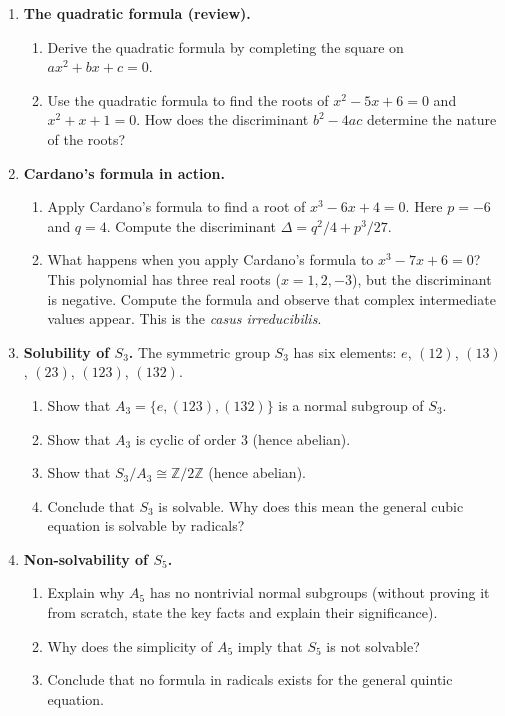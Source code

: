 \begin{enumerate}

    \item \textbf{The quadratic formula (review).}
    \begin{enumerate}
        \item Derive the quadratic formula by completing the square on $ax^2 + bx + c = 0$.
        \item Use the quadratic formula to find the roots of $x^2 - 5x + 6 = 0$ and $x^2 + x + 1 = 0$. How does the discriminant $b^2 - 4ac$ determine the nature of the roots?
    \end{enumerate}

    \item \textbf{Cardano's formula in action.}
    \begin{enumerate}
        \item Apply Cardano's formula to find a root of $x^3 - 6x + 4 = 0$. Here $p = -6$ and $q = 4$. Compute the discriminant $\Delta = q^2/4 + p^3/27$.
        \item What happens when you apply Cardano's formula to $x^3 - 7x + 6 = 0$? This polynomial has three real roots ($x = 1, 2, -3$), but the discriminant is negative. Compute the formula and observe that complex intermediate values appear. This is the \emph{casus irreducibilis}.
    \end{enumerate}

    \item \textbf{Solubility of $S_3$.} The symmetric group $S_3$ has six elements: $e$, $(12)$, $(13)$, $(23)$, $(123)$, $(132)$.
    \begin{enumerate}
        \item Show that $A_3 = \{e, (123), (132)\}$ is a normal subgroup of $S_3$.
        \item Show that $A_3$ is cyclic of order 3 (hence abelian).
        \item Show that $S_3/A_3 \cong \mathbb{Z}/2\mathbb{Z}$ (hence abelian).
        \item Conclude that $S_3$ is solvable. Why does this mean the general cubic equation is solvable by radicals?
    \end{enumerate}

    \item \textbf{Non-solvability of $S_5$.}
    \begin{enumerate}
        \item Explain why $A_5$ has no nontrivial normal subgroups (without proving it from scratch, state the key facts and explain their significance).
        \item Why does the simplicity of $A_5$ imply that $S_5$ is not solvable?
        \item Conclude that no formula in radicals exists for the general quintic equation.
    \end{enumerate}


\end{enumerate}
